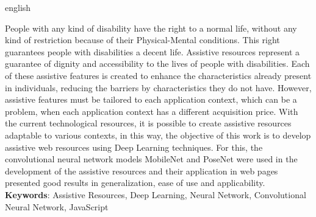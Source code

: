 \begin{resumo}[Abstract]
    \begin{otherlanguage*}{english}
        \par People with any kind of disability have the right to a normal life, without any kind of restriction because of their Physical-Mental conditions. This right guarantees people with disabilities a decent life. Assistive resources represent a guarantee of dignity and accessibility to the lives of people with disabilities. Each of these assistive features is created to enhance the characteristics already present in individuals, reducing the barriers by characteristics they do not have. However, assistive features must be tailored to each application context, which can be a problem, when each application context has a different acquisition price. With the current technological resources, it is possible to create assistive resources adaptable to various contexts, in this way, the objective of this work is to develop assistive web resources using Deep Learning techniques. For this, the convolutional neural network models MobileNet and PoseNet were used in the development of the assistive resources and their application in web pages presented good results in generalization, ease of use and applicability.
	    \vspace{\onelineskip}
	    \noindent
	    \\
	    \textbf{Keywords}: Assistive Resources, Deep Learning, Neural Network, Convolutional Neural Network, JavaScript %
    \end{otherlanguage*}
\end{resumo}
